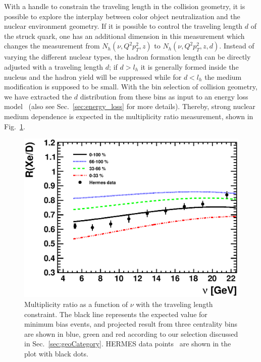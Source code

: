With a handle to constrain the traveling length in the
collision geometry, it is possible to explore the interplay between color
object neutralization and the nuclear environment geometry. If it is possible to
control the traveling length $d$ of the struck quark, one has an additional
dimension in this measurement which changes the measurement from
\(N_{h}(\nu,Q^{2}p^{2}_{T},z)\) to \(N_{h}(\nu,Q^{2}p^{2}_{T},z,d) \).
Instead of varying the different nuclear types, the hadron formation length can be
directly adjusted with a traveling length $d$; if $d>l_{h}$ it is generally
formed inside the nucleus and the hadron yield will be suppressed while for
$d<l_{h}$ the medium modification is supposed to be small. With the bin
selection of collision geometry, we have extracted the $d$ distribution from
these bins as input to an energy loss model~\cite{Salgado:2003gb} (also see Sec.~\ref{sec:energy_loss} for more details). Thereby,
strong nuclear medium dependence is expected in the multiplicity ratio
measurement, shown in Fig.~\ref{fig:energyLoss}.

\begin{figure}
\begin{center}
\includegraphics[width=0.7\columnwidth,keepaspectratio]{plots/chpt7/energyloss_Hermes_nu_qHat_0.85_tau_9.eps}
\caption[Energy loss measurement on Xenon target with several centrality bins versus $\nu$.]{Multiplicity ratio as a function of $\nu$ with the traveling length constraint. The black line represents the expected value for minimum bias events, and projected result from three centrality bins are shown in blue, green and red according to our selection discussed in Sec.~\ref{sec:geoCategory}. HERMES data points~\cite{Airapetian:2007vu} are shown in the plot with black dots.}
\label{fig:energyLoss}
\end{center}
\end{figure}



